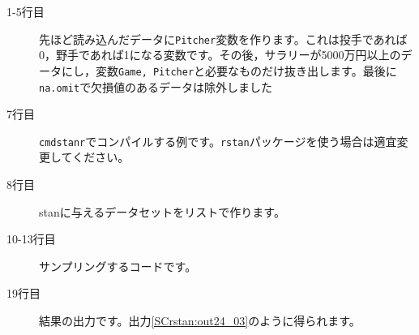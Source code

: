 \begin{description}
	\item[1-5行目] 先ほど読み込んだデータに\verb|Pitcher|変数を作ります。これは投手であれば0，野手であれば1になる変数です。その後，サラリーが5000万円以上のデータにし，変数\verb|Game, Pitcher|と必要なものだけ抜き出します。最後に\verb|na.omit|で欠損値のあるデータは除外しました
	\item[7行目] \texttt{cmdstanr}でコンパイルする例です。\texttt{rstan}パッケージを使う場合は適宜変更してください。
	\item[8行目] stanに与えるデータセットをリストで作ります。
	\item[10-13行目] サンプリングするコードです。
	\item[19行目] 結果の出力です。出力\ref{SCrstan:out24_03}のように得られます。
\end{description}
